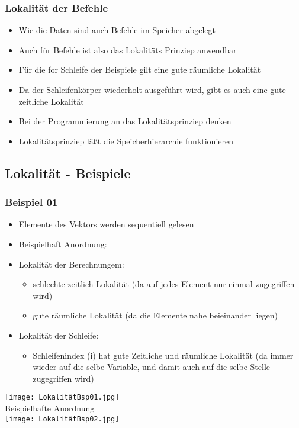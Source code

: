 		\subsubsection{Lokalität der Befehle}
			\begin{itemize}
				\item Wie die Daten sind auch Befehle im Speicher abgelegt
				\item Auch für Befehle ist also das Lokalitäts Prinziep anwendbar
				\item Für die for Schleife der Beispiele gilt eine gute räumliche Lokalität
				\item Da der Schleifenkörper wiederholt ausgeführt wird, gibt es auch eine gute zeitliche Lokalität
				\item Bei der Programmierung an das Lokalitätsprinziep denken
				\item Lokalitätsprinziep lä\ss t die Speicherhierarchie funktionieren
			\end{itemize}

		
	\subsection{Lokalität - Beispiele}
		\subsubsection{Beispiel 01}
			\begin{minipage}{0.5\textwidth}
				\begin{itemize}
					\item Elemente des Vektors werden sequentiell gelesen
					\item Beispielhaft Anordnung:
					\item Lokalität der Berechnungem:
						\begin{itemize}
							\item schlechte zeitlich Lokalität (da auf jedes Element nur einmal zugegriffen wird)
							\item gute räumliche Lokalität (da die Elemente nahe beieinander liegen)
						\end{itemize}
					\item Lokalität der Schleife:
						\begin{itemize}
							\item Schleifenindex (i) hat gute Zeitliche und räumliche Lokalität
								(da immer wieder auf die selbe Variable, und damit auch auf die selbe Stelle zugegriffen wird)
						\end{itemize}
				\end{itemize}
			\end{minipage}
			\begin{minipage}{0.45\textwidth}
				\begin{center}
					\texttt{[image: LokalitätBsp01.jpg]} \\
					Beispielhafte Anordnung \\
					\texttt{[image: LokalitätBsp02.jpg]}
				\end{center}
			\end{minipage}



